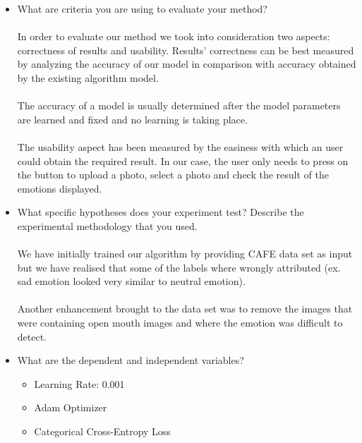 \documentclass[runningheads,a4paper,11pt]{report}
\begin{document}
\begin{itemize}
	\item What are criteria you are using to evaluate your method?
  \paragraph{}
  In order to evaluate our method we took into consideration two aspects: correctness of results and usability.
  Results' correctness can be best measured by analyzing the accuracy of our model in comparison with accuracy obtained by the existing algorithm model.
  \paragraph{}
  The accuracy of a model is usually determined after the model parameters are learned and fixed and no learning is taking place.
  \paragraph{}
  The usability aspect has been measured by the easiness with which an user could obtain the required result. In our case, the user only needs to press on the button to upload a photo, select a photo and check the result of the emotions displayed.
	\item What specific hypotheses does your experiment test? Describe the experimental methodology that you used.
  \paragraph{}
  We have initially trained our algorithm by providing CAFE data set as input but we have realised that some of the labels where wrongly attributed (ex. sad emotion looked very similar to neutral emotion).
  \paragraph{}
  Another enhancement brought to the data set was to remove the images that were containing open mouth images and where the emotion was difficult to detect.
	\item What are the dependent and independent variables?
  \begin{itemize}
    \item Learning Rate: 0.001
    \item Adam Optimizer
    \item Categorical Cross-Entropy Loss
  \end{itemize}


\end{itemize}
\end{document}
